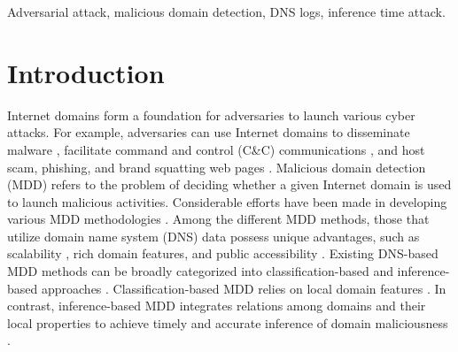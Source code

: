 \documentclass[conference,compsoc]{IEEEtran}
\begin{document}
\begin{IEEEkeywords}
Adversarial attack, malicious domain detection, DNS logs, inference time attack.
\end{IEEEkeywords}

\section{Introduction}
\label{Section1}
\par Internet domains form a foundation for adversaries to launch various cyber attacks. For example, adversaries can use Internet domains to disseminate malware \cite{abraham2010overview}, facilitate command and control (C\&C) communications \cite{zeidanloo2009botnet}, and host scam, phishing, and brand squatting web pages \cite{nabeel2022brand}. Malicious domain detection (MDD) refers to the problem of deciding whether a given Internet domain is used to launch malicious activities. 
Considerable efforts have been made in developing various MDD methodologies \cite{zhauniarovich2018survey}. Among the different MDD methods, those that utilize domain name system (DNS) data possess unique advantages, such as scalability \cite{khalil2017killing}, rich domain features, and public accessibility \cite{zhauniarovich2018survey}. Existing DNS-based MDD methods can be broadly categorized into classification-based and inference-based approaches \cite{nabeel2020following,li2021dydom,wang2022handom}. Classification-based MDD relies on local domain features \cite{antonakakis2010building,bilge2014exposure}. In contrast, inference-based MDD integrates relations among domains and their local properties to achieve timely and accurate inference of domain maliciousness \cite{manadhata2014detecting,khalil2016discovering,khalil2017killing,nabeel2020following,khalil2018domain,sun2019hindom,li2021dydom,zhang2021attributed,li2022heterogeneous}.
\end{document}

